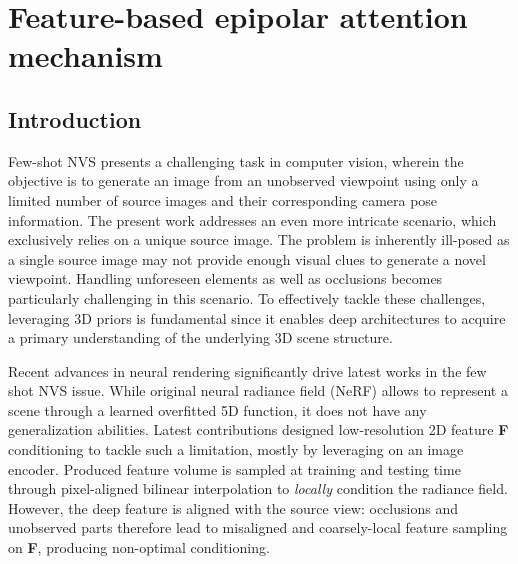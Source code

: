 \chapter{Feature-based epipolar attention mechanism}
\label{chapter:epinerf}





\section{Introduction}


Few-shot NVS presents a challenging task in computer vision, wherein the objective is to generate an image from an unobserved viewpoint using only a limited number of source images and their corresponding camera pose information. The present work addresses an even more intricate scenario, which exclusively relies on a unique source image. The problem is inherently ill-posed as a single source image may not provide enough visual clues to generate a novel viewpoint. Handling unforeseen elements as well as occlusions becomes particularly challenging in this scenario. To effectively tackle these challenges, leveraging 3D priors \citep{saito2019pifu,johari2022geonerf} is fundamental since it enables deep architectures to acquire a primary understanding of the underlying 3D scene structure. 

Recent advances in neural rendering \citep{tewari2022advances} significantly drive latest works in the few shot NVS issue. While original neural radiance field (NeRF) \citep{mildenhall2020nerf} allows to represent a scene through a learned overfitted 5D function, it does not have any generalization abilities. Latest contributions \citep{yu2021pixelnerf,li2022symmnerf,lin2023vision} designed low-resolution 2D feature \textbf{F} conditioning to tackle such a limitation, mostly by leveraging on an image encoder. Produced feature volume is sampled at training and testing time through pixel-aligned bilinear interpolation to \textit{locally} condition the radiance field. However, the deep feature is aligned with the source view: occlusions and unobserved parts therefore lead to misaligned and coarsely-local feature sampling on \textbf{F}, producing non-optimal conditioning. 

